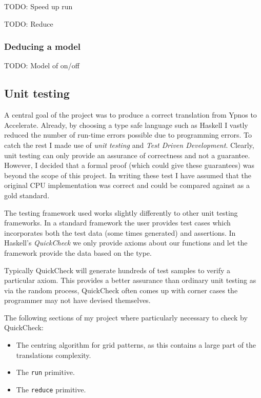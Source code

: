 TODO: Speed up run

TODO: Reduce

\subsubsection{Deducing a model}

TODO: Model of on/off

\subsection{Unit testing}

A central goal of the project was to produce a correct translation from
Ypnos to Accelerate. Already, by choosing a type safe language such as
Haskell I vastly reduced the number of run-time errors possible due to
programming errors. To catch the rest I made use of \emph{unit testing}
and \emph{Test Driven Development}. Clearly, unit testing can only
provide an assurance of correctness and not a guarantee. However, I
decided that a formal proof (which could give these guarantees) was
beyond the scope of this project. In writing these test I have assumed
that the original CPU implementation was correct and could be compared
against as a gold standard.

The testing framework used works slightly differently to other unit
testing frameworks. In a standard framework the user provides test cases
which incorporates both the test data (some times generated) and
assertions. In Haskell's \emph{QuickCheck} we only provide axioms about
our functions and let the framework provide the data based on the type.

Typically QuickCheck will generate hundreds of test samples to verify a
particular axiom. This provides a better assurance than ordinary unit
testing as via the random process, QuickCheck often comes up with corner
cases the programmer may not have devised themselves.

The following sections of my project where particularly necessary to
check by QuickCheck:

\begin{itemize}
\itemsep1pt\parskip0pt
\item
  The centring algorithm for grid patterns, as this contains a large
  part of the translations complexity.
\item
  The \texttt{run} primitive.
\item
  The \texttt{reduce} primitive.
\end{itemize}

